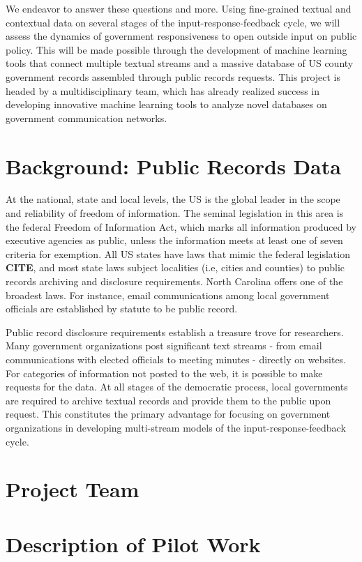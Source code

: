 We endeavor to answer these questions and more. Using fine-grained textual and contextual data on several stages of the input-response-feedback cycle, we will assess the dynamics of government responsiveness to open outside input on public policy. This will be made possible through the development of machine learning tools that connect multiple textual streams and a massive database of US county government records assembled through public records requests. This project is headed by a multidisciplinary team, which has already realized success in developing innovative machine learning tools to analyze novel databases on government communication networks. 


\section{Background: Public Records Data}

At the national, state and local levels, the US is the global leader in the scope and reliability of freedom of information. The seminal legislation in this area is the federal Freedom of Information Act, which marks all information produced by executive agencies as public, unless the information meets at least one of seven criteria for exemption. All US states have laws that mimic the federal legislation {\bf CITE}, and most state laws subject localities (i.e, cities and counties) to public records archiving and disclosure requirements. North Carolina offers one of the broadest laws. For instance, email communications among local government officials are established by statute to be public record. 

Public record disclosure requirements establish a treasure trove for researchers. Many government organizations post significant text streams - from email communications with elected officials to meeting minutes - directly on websites. For categories of information not posted to the web, it is possible to make requests for the data. At all stages of the democratic process, local governments are required to archive textual records and provide them to the public upon request. This constitutes the primary advantage for focusing on government organizations in developing multi-stream models of the input-response-feedback cycle. 

\section{Project Team}

\section{Description of Pilot Work}

